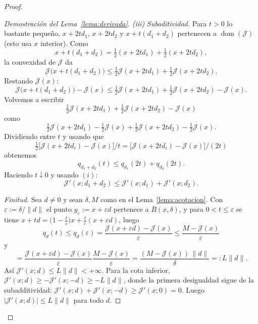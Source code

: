\documentclass[12pt]{book}
\theoremstyle{definition}
\theoremstyle{plain}
\theoremstyle{remark}
\begin{document}
\begin{proof}
\begin{proof}[Demostraci\'on del Lema~\ref{lema:derivada}]
\medskip

\noindent
\emph{(iii)}
\emph{Subaditividad.} Para $t>0$ lo bastante peque\~no, $x+2td_{1}$,
$x+2td_{2}$ y $x+t(d_{1}+d_{2})$ pertenecen a
$\operatorname{dom}(\mathcal{J})$ (esto usa $x$ interior). Como
\[
x+t(d_{1}+d_{2})=\tfrac12(x+2td_{1})+\tfrac12(x+2td_{2}),
\]
la convexidad de $\mathcal{J}$ da
\[
\mathcal{J}\bigl(x+t(d_{1}+d_{2})\bigr)
\le\tfrac12 \mathcal{J}(x+2td_{1})
+\tfrac12 \mathcal{J}(x+2td_{2}).
\] 
Restando $\mathcal{J}(x)$:
\[
\mathcal{J}\bigl(x+t(d_{1}+d_{2})\bigr) - \mathcal{J}(x)
\le\tfrac12 \mathcal{J}(x+2td_{1})
+\tfrac12 \mathcal{J}(x+2td_{2})
- \mathcal{J}(x)
.
\] 
Volvemos a escribir
\[
\tfrac12 \mathcal{J}(x+2td_{1})
+\tfrac12 \mathcal{J}(x+2td_{2})
- \mathcal{J}(x)
\]
como
\[
\tfrac12 \mathcal{J}(x+2td_{1})
- \tfrac12 \mathcal{J}(x)
+\tfrac12 \mathcal{J}(x+2td_{2})
- \tfrac12 \mathcal{J}(x).
%
\]
Dividiendo entre $t$
%
y usando que
\[\tfrac12\bigl[\mathcal{J}(x+2td_{i})-\mathcal{J}(x)\bigr]/t=
\bigl[\mathcal{J}(x+2td_{i})-\mathcal{J}(x)\bigr]/(2t)\] obtenemos
\[
q_{d_{1}+d_{2}}(t)\le q_{d_{1}}(2t)+q_{d_{2}}(2t).
\]
Haciendo $t\downarrow0$ y usando $(i)$:
\[
\mathcal{J}'(x;d_{1}+d_{2})\le
\mathcal{J}'(x;d_{1})+\mathcal{J}'(x;d_{2}).\]

\emph{Finitud.} Sea $d\neq0$ y sean $\delta,M$ como en el
Lema~\ref{lema:acotacion}. Con $\varepsilon:=\delta/\|d\|$ el punto
$y_{\varepsilon}:=x+\varepsilon d$ pertenece a
$\overline{B}(x,\delta)$, y para $0<t\le\varepsilon$ se tiene
$x+td=\bigl(1-\tfrac{t}{\varepsilon}\bigr)x
+\tfrac{t}{\varepsilon}(x+\varepsilon d)$, luego
\[
q_{d}(t)\le q_{d}(\varepsilon)
=\frac{\mathcal{J}(x+\varepsilon d)-\mathcal{J}(x)}{\varepsilon}
\le\frac{M-\mathcal{J}(x)}{\varepsilon}
\]
y
\[
=\frac{\mathcal{J}(x+\varepsilon d)-\mathcal{J}(x)}{\varepsilon}
\frac{M-\mathcal{J}(x)}{\varepsilon}
=\frac{(M-\mathcal{J}(x))\,\|d\|}{\delta}=:L\|d\|.
\]
As\'i $\mathcal{J}'(x;d)\le L\|d\|<+\infty$. Para la cota inferior,
$\mathcal{J}'(x;d)\ge -\mathcal{J}'(x;-d)\ge -L\|d\|$, donde la primera
desigualdad sigue de la subadditividad:
$\mathcal{J}'(x;d)+\mathcal{J}'(x;-d)\ge\mathcal{J}'(x;0)=0$. Luego
$|\mathcal{J}'(x;d)|\le L\|d\|$ para todo $d$.
\end{proof}


\end{proof}
\end{document}
